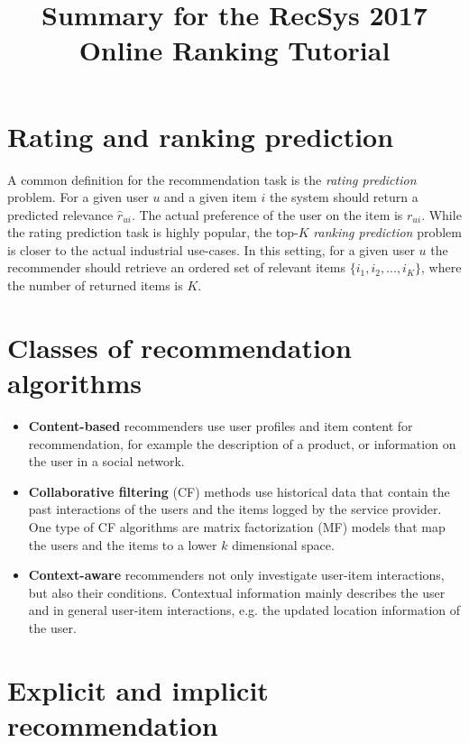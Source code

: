 \documentclass[10pt]{article}
\newenvironment{myitemize}{\begin{itemize} \setlength{\topsep}{0pt} \setlength{\itemsep}{0pt} \setlength{\parskip}{0pt} \setlength{\parsep}{0pt}}{  \end{itemize} }
\begin{document}
\title{Summary for the RecSys 2017 Online Ranking Tutorial}
\date{\vspace{-0.1cm}}
\maketitle

\section{Rating and ranking prediction}

A common definition for the recommendation task is the \emph{rating prediction} problem.
For a given user $u$ and a given item $i$ the system should return a predicted relevance $\hat{r}_{ui}$.
The actual preference of the user on the item is $r_{ui}$.
While the rating prediction task is highly popular, the top-$K$ \emph{ranking prediction} problem is closer to the actual industrial use-cases.
In this setting, for a given user $u$ the recommender should retrieve an ordered set of relevant items $\lbrace {i_1, i_2, ..., i_K}\rbrace$, where the number of returned items is $K$.

\section{Classes of recommendation algorithms}

\begin{myitemize}
\item \textbf{Content-based} recommenders use user profiles and item content for recommendation, for example the description of a product, or information on the user in a social network.

\item \textbf{Collaborative filtering} (CF) methods use historical data that contain the past interactions of the users and the items logged by the service provider.
One type of CF algorithms are matrix factorization (MF) models that map the users and the items to a lower $k$ dimensional space.

\item \textbf{Context-aware} recommenders not only investigate user-item interactions, but also their conditions.
Contextual information mainly describes the user and in general user-item interactions, e.g. the updated location information of the user.
\end{myitemize}
\section{Explicit and implicit recommendation}
\end{document}
